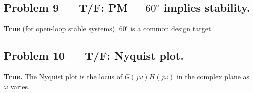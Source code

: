 \documentclass[11pt]{article}
\begin{document}
\subsection{Problem 9 --- T/F: PM $=60^\circ$ implies stability.}
\textbf{True} (for open-loop stable systems). $60^\circ$ is a common design target.

\subsection{Problem 10 --- T/F: Nyquist plot.}
\textbf{True.} The Nyquist plot is the locus of $G(j\omega)H(j\omega)$ in the complex plane as $\omega$ varies.
\end{document}
